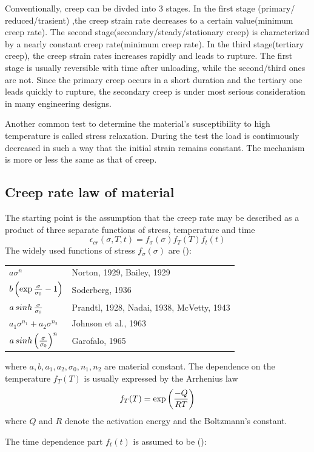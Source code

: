 \documentclass[10pt]{article}
\begin{document}
Conventionally, creep can be divded into $3$ stages. In the first stage (primary/ reduced/trasient) ,the creep strain rate decreases to a certain value(minimum creep rate). The second stage(secondary/steady/stationary creep) is characterized by a nearly constant creep rate(minimum creep rate). In the third stage(tertiary creep), the creep strain rates increases rapidly and leads to rupture. The first stage is usually reversible with time after unloading, while the second/third ones are not. Since the primary creep occurs in a short duration and the tertiary one leads quickly to rupture, the secondary creep is under most serious consideration in many engineering designs.

Another common test to determine the material's susceptibility to high temperature is called stress relaxation. During the test the load is continuously decreased in such a way that the initial strain remains constant. The mechanism is more or less the same as that of creep.

\subsection{Creep rate law of material}
\label{sec:Creep}
The starting point is the assumption that the creep rate may be described as a product of three separate functions of stress, temperature and time
\[
\epsilon_{cr}(\sigma,T,t)=f_\sigma (\sigma) f_T(T) f_t(t)
\]
The widely used functions of stress $f_\sigma(\sigma)$ are (\cite{Creep}):

\begin{tabular}{ll}
$a\sigma^n$ & Norton, 1929, Bailey, 1929 \\
$b\left( \exp{\sigma\over \sigma_0} -1 \right)$ & Soderberg, 1936 \\
$a\mathop{sinh}{\sigma\over \sigma_0}$ & Prandtl, 1928, Nadai, 1938, McVetty, 1943\\
$a_1\sigma^{n_1} + a_2 \sigma^{n_2}$ & Johnson et al., 1963 \\
$a\mathop{sinh} \left( {\sigma\over \sigma_0}\right)^n$ & Garofalo, 1965
\end{tabular}

where $a,b,a_1,a_2,\sigma_0,n_1,n_2$ are material constant. The dependence on the temperature $f_T(T)$ is usually expressed by the Arrhenius law
\[
f_T(T) = \exp \left( {-Q\over RT}\right)
\]
where $Q$ and $R$ denote the activation energy and the Boltzmann's constant.

The time dependence part $f_t(t)$ is assumed to be (\cite{Ch2000}):
\end{document}
